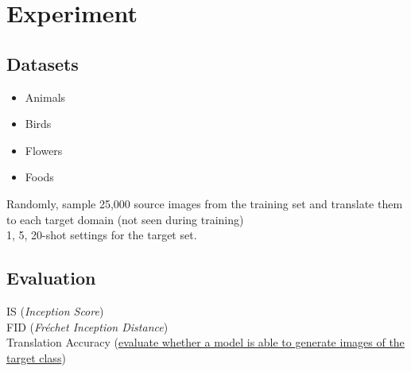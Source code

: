 \documentclass[10pt]{article}
\begin{document}
        \section*{Experiment}
            \subsection*{Datasets}
                \begin{itemize}
                    \item Animals
                    \item Birds
                    \item Flowers
                    \item Foods
                \end{itemize}
                Randomly, sample 25,000 source images from the training set and translate them to each target domain (not seen during training) \\
                1, 5, 20-shot settings for the target set. \\
            \subsection*{Evaluation}
                IS (\textit{Inception Score}) \\
                FID (\textit{Fréchet Inception Distance}) \\
                Translation Accuracy (\href{https://arxiv.org/pdf/1905.01723.pdf}{evaluate whether a model is able to generate images of the target class})
            
\end{document}
